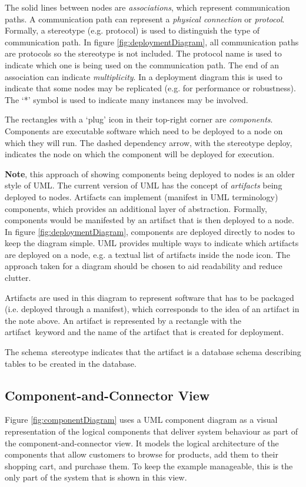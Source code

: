 The solid lines between nodes are \emph{associations}, which represent communication paths.
A communication path can represent a \emph{physical connection} or \emph{protocol}.
Formally, a stereotype (e.g. \guillemotleft protocol\guillemotright) is used to distinguish the type of communication path.
In figure \ref{fig:deploymentDiagram}, all communication paths are protocols so the stereotype is not included.
The protocol name is used to indicate which one is being used on the communication path.
The end of an association can indicate \emph{multiplicity}.
In a deployment diagram this is used to indicate that some nodes may be replicated
(e.g. for performance or robustness). The `*' symbol is used to indicate many instances may be involved.

The rectangles with a `plug' icon in their top-right corner are \emph{components}.
Components are executable software which need to be deployed to a node on which they will run.
The dashed dependency arrow, with the stereotype \guillemotleft deploy\guillemotright, indicates the node on which the component will be deployed for execution.

\textbf{Note}, this approach of showing components being deployed to nodes is an older style of UML.
The current version of UML has the concept of \emph{artifacts} being deployed to nodes.
Artifacts can implement (manifest in UML terminology) components, which provides an additional layer of abstraction.
Formally, components would be manifested by an artifact that is then deployed to a node.
In figure \ref{fig:deploymentDiagram}, components are deployed directly to nodes to keep the diagram simple.
UML provides multiple ways to indicate which artifacts are deployed on a node, e.g. a textual list of artifacts inside the node icon.
The approach taken for a diagram should be chosen to aid readability and reduce clutter.

Artifacts are used in this diagram to represent software that has to be packaged
(i.e. deployed through a manifest), which corresponds to the idea of an artifact in the note above.
An artifact is represented by a rectangle with the \guillemotleft artifact\guillemotright~keyword and the name of the artifact that is created for deployment.

The \guillemotleft schema\guillemotright~stereotype indicates that the artifact is a database schema describing tables to be created in the database.

\subsection{Component-and-Connector View}\label{sec:CnC_view}
Figure \ref{fig:componentDiagram} uses a UML component diagram as a visual representation of
the logical components that deliver system behaviour as part of the component-and-connector view.
It models the logical architecture of the components that allow customers to browse for products, add them to their shopping cart, and purchase them.
To keep the example manageable, this is the only part of the system that is shown in this view.

